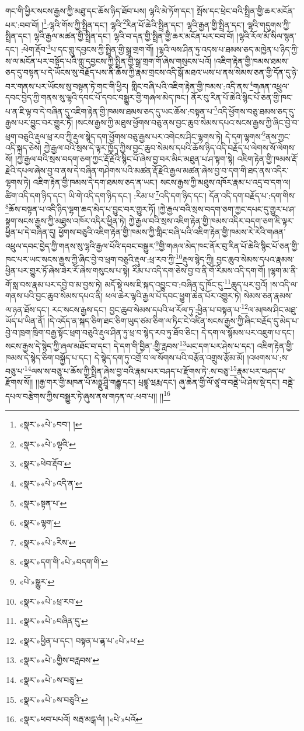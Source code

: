 གང་གི་ཕྱིར་སངས་རྒྱས་ཀྱི་མཐུ་དང་ཆོས་ཉིད་ཐོབ་པས། ལྷའི་མེ་ཏོག་དང་། སྤོས་དང་ཕྲེང་བའི་སྤྲིན་གྱི་ཆར་མངོན་པར་:བབ་བོ། །\footnote{«སྣར་»«པེ་»བབ་། ། }:ལྷའི་གོས་ཀྱི་སྤྲིན་དང་། ལྷའི་\footnote{«སྣར་»«པེ་»ལྷའི་}རིན་པོ་ཆེའི་སྤྲིན་དང་། ལྷའི་རྒྱན་གྱི་སྤྲིན་དང་། ལྷའི་གདུགས་ཀྱི་སྤྲིན་དང་། ལྷའི་རྒྱལ་མཚན་གྱི་སྤྲིན་དང་། ལྷའི་བ་དན་གྱི་སྤྲིན་གྱི་ཆར་མངོན་པར་བབ་བོ། །ལྷའི་རོལ་མོ་སིལ་སྙན་དང་། :ཕེག་རྡོབ་\footnote{«སྣར་»ཕེབ་རྡོབ་}པ་དང་གླུ་དབྱངས་ཀྱི་སྤྲིན་གྱི་སྒྲ་གྲག་གོ། །ལྷའི་ལས་ཤིན་ཏུ་འདས་པ་ཐམས་ཅད་མཁྱེན་པ་ཉིད་ཀྱི་ས་ལ་མངོན་པར་བསྟོད་པའི་གླུ་དབྱངས་ཀྱི་སྤྲིན་གྱི་སྒྲ་གྲག་གོ་ཞེས་གསུངས་པའོ། །འཇིག་རྟེན་གྱི་ཁམས་ཐམས་ཅད་དུ་བསྟན་པ་དེ་ཡོངས་སུ་བརྗོད་པས་ནི་ཆོས་ཀྱི་རྣམ་གྲངས་འདི་སྒོ་མཐའ་ཡས་པ་ནས་སེམས་ཅན་གྱི་དོན་དུ་ཉེ་བར་གནས་པར་ཡོངས་སུ་བསྟན་ཏེ་གང་གི་ཕྱིར། གླིང་བཞི་པའི་འཇིག་རྟེན་གྱི་ཁམས་:འདི་ནས་\footnote{«སྣར་»«པེ་»འདི་ན་}གཞན་འཕྲུལ་དབང་བྱེད་ཀྱི་གནས་སུ་ལྷའི་དབང་པོ་དབང་བསྒྱུར་གྱི་གཞལ་མེད་ཁང་། ནོར་བུ་རིན་པོ་ཆེའི་སྙིང་པོ་ཅན་གྱི་ཁང་པ་ན་ཇི་ལྟ་བ་དེ་བཞིན་དུ་འཇིག་རྟེན་གྱི་ཁམས་ཐམས་ཅད་དུ་ཡང་ཆོས་:བསྟན་པ་\footnote{«སྣར་»སྟན་པ་}འདི་ཕྱོགས་བཅུ་ཐམས་ཅད་དུ་རྒྱས་པར་བྱུང་བར་གྱུར་ཏོ། །སངས་རྒྱས་ཀྱི་མཐུས་ཕྱོགས་བཅུ་ནས་བྱང་ཆུབ་སེམས་དཔའ་སངས་རྒྱས་ཀྱི་ཞིང་བྱེ་བ་ཕྲག་བཅུའི་རྡུལ་ཕྲ་རབ་ཀྱི་རྡུལ་སྙེད་དག་ཕྱོགས་བཅུ་རྒྱས་པར་འགེངས་ཤིང་ལྷགས་ཏེ། དེ་དག་ལྷགས་\footnote{«སྣར་»ལྷག་}ནས་ཀྱང་འདི་སྐད་ཅེས། ཀྱེ་རྒྱལ་བའི་སྲས་དེ་ལྟར་ཁྱོད་ཀྱིས་བྱང་ཆུབ་སེམས་དཔའི་ཆོས་ཉིད་འདི་བརྗོད་པ་ལེགས་སོ་ལེགས་སོ། །ཀྱེ་རྒྱལ་བའི་སྲས་བདག་ཅག་ཀྱང་རྡོ་རྗེའི་སྙིང་པོ་ཞེས་བྱ་བར་མིང་མཐུན་པ་ཤ་སྟག་སྟེ། འཇིག་རྟེན་གྱི་ཁམས་རྡོ་རྗེའི་དཔལ་ཞེས་བྱ་བ་ནས་དེ་བཞིན་གཤེགས་པའི་མཚན་རྡོ་རྗེའི་རྒྱལ་མཚན་ཞེས་བྱ་བ་དག་གི་ཐད་ནས་འདིར་ལྷགས་ཏེ། འཇིག་རྟེན་གྱི་ཁམས་དེ་དག་ཐམས་ཅད་ན་ཡང་། སངས་རྒྱས་ཀྱི་མཐུས་འཁོར་རྣམ་པ་འདྲ་བ་དག་ལ། ཚིག་འདི་དག་ཉིད་དང་། ཡི་གེ་འདི་དག་ཉིད་དང་། :རིམ་པ་\footnote{«སྣར་»«པེ་»རིས་}འདི་དག་ཉིད་དང་། དོན་འདི་དག་བརྗོད་པ་:དག་གིས་\footnote{«སྣར་»དག་གི་«པེ་»བདག་གི་}ཆོས་བསྟན་པ་འདི་ཉིད་ལྷག་ཆད་མེད་པ་བྱུང་བར་གྱུར་ཏོ། །ཀྱེ་རྒྱལ་བའི་སྲས་བདག་ཅག་ཀྱང་དཔང་དུ་གྱུར་པ་ཤ་སྟག་སངས་རྒྱས་ཀྱི་མཐུས་འཁོར་འདིར་ཕྱིན་ཏེ། ཀྱེ་རྒྱལ་བའི་སྲས་འཇིག་རྟེན་གྱི་ཁམས་འདིར་བདག་ཅག་ཇི་ལྟར་ཕྱིན་པ་དེ་བཞིན་དུ། ཕྱོགས་བཅུའི་འཇིག་རྟེན་གྱི་ཁམས་ཀྱི་གླིང་བཞི་པའི་འཇིག་རྟེན་གྱི་ཁམས་རེ་རེའི་གཞན་འཕྲུལ་དབང་བྱེད་ཀྱི་གནས་སུ་ལྷའི་རྒྱལ་པོའི་དབང་བསྒྱུར་\footnote{«པེ་»སྒྱུར་}གྱི་གཞལ་མེད་ཁང་ནོར་བུ་རིན་པོ་ཆེའི་སྙིང་པོ་ཅན་གྱི་ཁང་པར་ཡང་སངས་རྒྱས་ཀྱི་ཞིང་བྱེ་བ་ཕྲག་བཅུའི་རྡུལ་:ཕྲ་རབ་ཀྱི་\footnote{«སྣར་»«པེ་»ཕྲ་རབ་}རྡུལ་སྙེད་ཀྱི། བྱང་ཆུབ་སེམས་དཔའ་རྣམས་ཕྱིན་པར་གྱུར་ཏོ་ཞེས་ཟེར་རོ་ཞེས་གསུངས་པ་སྟེ། རིམ་པ་འདི་དག་ཅེས་བྱ་བ་ནི་གོ་རིམས་འདི་དག་གོ། །ལྷག་མ་ནི་གོ་སླ་བས་རྣམ་པར་དབྱེ་བ་མ་བྱས་ཏེ། མདོ་སྡེ་ལས་ཇི་སྐད་འབྱུང་བ་:བཞིན་དུ་ཁོང་དུ་\footnote{«སྣར་»«པེ་»བཞིན་དུ་}ཆུད་པར་བྱའོ། །ས་འདི་ལ་གནས་པའི་བྱང་ཆུབ་སེམས་དཔའ་ནི། ཕལ་ཆེར་ལྷའི་རྒྱལ་པོ་དབང་ཕྱུག་ཆེན་པོར་འགྱུར་ཏེ། སེམས་ཅན་རྣམས་ལ་ཉན་ཐོས་དང་། རང་སངས་རྒྱས་དང་། བྱང་ཆུབ་སེམས་དཔའི་ཕ་རོལ་ཏུ་:ཕྱིན་པ་བསྟན་པ་\footnote{«སྣར་»ཕྱིན་པ་དང་། བསྟན་པ་ྟན་པ་«པེ་»པ་}ལ་མཁས་ཤིང་མཐུ་ཡོད་པ་ཡིན་ནོ། །དེ་འདོད་ན་སྐད་ཅིག་ཐང་ཅིག་ཡུད་ཙམ་ཅིག་ལ་ཏིང་ངེ་འཛིན་སངས་རྒྱས་ཀྱི་ཞིང་བརྗོད་དུ་མེད་པ་བྱེ་བ་ཁྲག་ཁྲིག་བརྒྱ་སྟོང་ཕྲག་བཅུའི་རྡུལ་ཤིན་ཏུ་ཕྲ་བ་སྙེད་རབ་ཏུ་ཐོབ་ཅིང་། དེ་དག་ལ་སྙོམས་པར་འཇུག་པ་དང་། སངས་རྒྱས་དེ་སྙེད་ཀྱི་ཞལ་མཐོང་བ་དང་། དེ་དག་གི་བྱིན་:གྱི་རླབས་\footnote{«སྣར་»«པེ་»གྱིས་བརླབས་}ཡང་དག་པར་ཤེས་པ་དང་། འཇིག་རྟེན་གྱི་ཁམས་དེ་སྙེད་ཅིག་བསྐྱོད་པ་དང་། དེ་སྙེད་དག་ཏུ་འགྲོ་བ་ལ་སོགས་པའི་བརྩོན་འགྲུས་རྩོམ་མོ། །འཕགས་པ་:ས་བཅུ་པ་\footnote{«སྣར་»«པེ་»ས་བཅུ་}ལས་ས་བཅུ་པ་ཆོས་ཀྱི་སྤྲིན་ཞེས་བྱ་བའི་རྣམ་པར་བཤད་པ་རྫོགས་ཏེ་:ས་བཅུ་\footnote{«སྣར་»«པེ་»ས་བཅུའི་}རྣམ་པར་བཤད་པ་རྫོགས་སོ།། །།རྒྱ་གར་གྱི་མཁན་པོ་མཉྫུ་ཤྲཱི་གརྦྷ་དང་། པྲཛྙཱ་ཝརྨ་དང་། ཞུ་ཆེན་གྱི་ལོ་ཙཱ་བ་བནྡེ་ཡེ་ཤེས་སྡེ་དང་། བནྡེ་དཔལ་བརྩེགས་ཀྱིས་བསྒྱུར་ཏེ་ཞུས་ནས་གཏན་ལ་:ཕབ་པ།། །།\footnote{«སྣར་»ཕབ་པཔའོ། སརྦ་མངྒ་ལཾ། །«པེ་»པའོ}